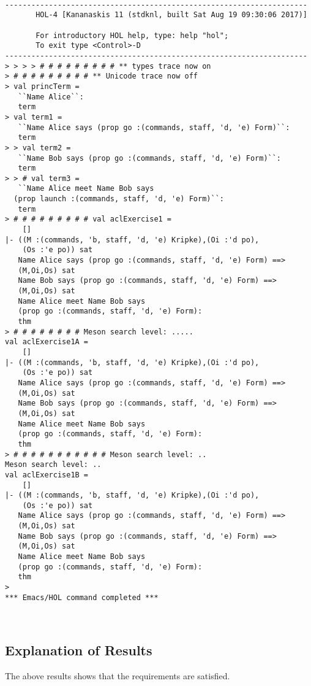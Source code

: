 \documentclass{report}
\begin{document}
\setcounter{sessioncount}{0}
\begin{session}
  \begin{scriptsize}
\begin{verbatim}

---------------------------------------------------------------------
       HOL-4 [Kananaskis 11 (stdknl, built Sat Aug 19 09:30:06 2017)]

       For introductory HOL help, type: help "hol";
       To exit type <Control>-D
---------------------------------------------------------------------
> > > > # # # # # # # # # ** types trace now on
> # # # # # # # # # ** Unicode trace now off
> val princTerm =
   ``Name Alice``:
   term
> val term1 =
   ``Name Alice says (prop go :(commands, staff, 'd, 'e) Form)``:
   term
> > val term2 =
   ``Name Bob says (prop go :(commands, staff, 'd, 'e) Form)``:
   term
> > # val term3 =
   ``Name Alice meet Name Bob says
  (prop launch :(commands, staff, 'd, 'e) Form)``:
   term
> # # # # # # # # # val aclExercise1 =
    []
|- ((M :(commands, 'b, staff, 'd, 'e) Kripke),(Oi :'d po),
    (Os :'e po)) sat
   Name Alice says (prop go :(commands, staff, 'd, 'e) Form) ==>
   (M,Oi,Os) sat
   Name Bob says (prop go :(commands, staff, 'd, 'e) Form) ==>
   (M,Oi,Os) sat
   Name Alice meet Name Bob says
   (prop go :(commands, staff, 'd, 'e) Form):
   thm
> # # # # # # # # Meson search level: .....
val aclExercise1A =
    []
|- ((M :(commands, 'b, staff, 'd, 'e) Kripke),(Oi :'d po),
    (Os :'e po)) sat
   Name Alice says (prop go :(commands, staff, 'd, 'e) Form) ==>
   (M,Oi,Os) sat
   Name Bob says (prop go :(commands, staff, 'd, 'e) Form) ==>
   (M,Oi,Os) sat
   Name Alice meet Name Bob says
   (prop go :(commands, staff, 'd, 'e) Form):
   thm
> # # # # # # # # # # # Meson search level: ..
Meson search level: ..
val aclExercise1B =
    []
|- ((M :(commands, 'b, staff, 'd, 'e) Kripke),(Oi :'d po),
    (Os :'e po)) sat
   Name Alice says (prop go :(commands, staff, 'd, 'e) Form) ==>
   (M,Oi,Os) sat
   Name Bob says (prop go :(commands, staff, 'd, 'e) Form) ==>
   (M,Oi,Os) sat
   Name Alice meet Name Bob says
   (prop go :(commands, staff, 'd, 'e) Form):
   thm
> 
*** Emacs/HOL command completed ***

 
\end{verbatim}
  \end{scriptsize}
\end{session}

\subsection{Explanation of Results}
\label{sec:explanation-results-1}
The above results shows that the requirements are satisfied.
\end{document}
